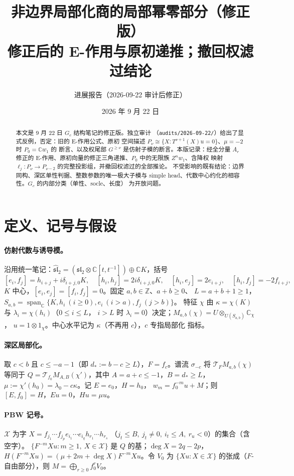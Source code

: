 \documentclass[11pt]{article}
\title{非边界局部化商的局部幂零部分（修正版）\\
  \large 修正后的 E-作用与原初递推；撤回权滤过结论}
\author{进展报告（2026-09-22 审计后修正）}
\date{2026 年 9 月 22 日}
\newcommand{\C}{\mathbb C}
\newcommand{\Z}{\mathbb Z}
\newcommand{\g}{\widehat{\mathfrak{sl}}_2}
\newcommand{\Span}{\operatorname{span}_{\C}}
\begin{document}
\maketitle

\begin{abstract}
本文是 9 月 22 日 $G_c$ 结构笔记的修正版。独立审计
（\texttt{audits/2026-09-22/}）给出了显式反例，否定：旧的 E-作用公式、原初
空间描述 $P_\nu\cong\{X:T^{\nu+1}(X)u=0\}$、$\mu=-2$ 时 $P_0=\C w_1$ 的
断言、以及权尾部 $G^{\ge\nu}$ 是仿射子模的断言。本版记录：经全分量 $A_r$
修正的 E-作用、原初向量的修正三角递推、$P_0$ 中的无限族 $Z^nw_1$、含降权
映射 $\ell_j:P_\nu\to P_{\nu-2}$ 的完整投影组，并撤回权滤过的全部推论。
不受影响的既有结论：边界同构、深区单性判据、整数参数的唯一极大子模与
simple head、代数中心约化的相容性。$G_c$ 的内部分类（单性、socle、长度）
为开放问题。
\end{abstract}

\section{定义、记号与假设}

\paragraph{仿射代数与诱导模。}
沿用统一笔记：$\g=(\mathfrak{sl}_2\otimes\C[t,t^{-1}])\oplus\C K$，括号
\[
 [e_i,f_j]=h_{i+j}+i\delta_{i+j,0}K,\quad [h_i,h_j]=2i\delta_{i+j,0}K,\quad
 [h_i,e_j]=2e_{i+j},\quad [h_i,f_j]=-2f_{i+j},
\]
$K$ 中心，$[e_i,e_j]=[f_i,f_j]=0$。固定 $a,b\in\Z$、$a+b\ge0$、
$L=a+b+1\ge1$，$S_{a,b}=\Span\{K,h_i\ (i\ge0),e_i\ (i>a),f_j\ (j>b)\}$。
特征 $\chi$ 由 $\kappa=\chi(K)$ 与 $\lambda_i=\chi(h_i)$（$0\le i\le L$，
$i>L$ 时 $\lambda_i=0$）决定；$M_{a,b}(\chi)=U\otimes_{U(S_{a,b})}\C_\chi$，
$u=1\otimes1_\chi$。中心水平记为 $\kappa$（不再用 $c$），$c$ 专指局部化
指标。

\paragraph{深区局部化。}
取 $c<b$ 且 $c\le-a-1$（即 $d_*:=b-c\ge L$），$F=f_c$。谱流
$\sigma_{-c}$ 将 $\mathcal T_FM_{a,b}(\chi)$ 等同于
$Q=\mathcal T_{f_0}M_{A,B}(\chi')$，其中 $A=a+c\le-1$，$B=d_*\ge L$，
$\mu:=\chi'(h_0)=\lambda_0-c\kappa$。记 $E=e_0$，$H=h_0$，
$w_m=f_0^{-m}u+M$；则 $[E,f_0]=H$，$Eu=0$，$Hu=\mu u$。

\paragraph{PBW 记号。}
$\mathcal X$ 为字
$X=f_{j_1}\cdots f_{j_p}e_{i_1}\cdots e_{i_q}h_{r_1}\cdots h_{r_s}$
（$j_t\le B,\ j_t\ne0,\ i_t\le A,\ r_u<0$）的集合（含空字）。
$\{F^{-m}Xu:m\ge1,\ X\in\mathcal X\}$ 是 $Q$ 的基；$\deg X=2q-2p$，
$H(F^{-m}Xu)=(\mu+2m+\deg X)F^{-m}Xu$。令 $V_0$ 为 $\{Xu:X\in\mathcal X\}$
的张成（$F$-自由部分），则 $M=\bigoplus_{r\ge0}f_0^rV_0$。
\end{document}
